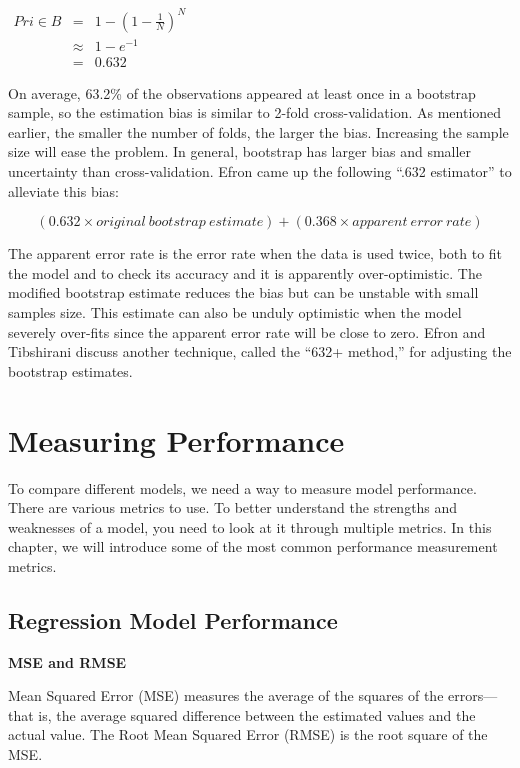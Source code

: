 \documentclass[12pt,]{krantz}
\begin{document}
\(\begin{array}{ccc} Pr{i\in B} & = & 1-\left(1-\frac{1}{N}\right)^{N}\\  & \approx & 1-e^{-1}\\  & = & 0.632 \end{array}\)

On average, 63.2\% of the observations appeared at least once in a bootstrap sample, so the estimation bias is similar to 2-fold cross-validation. As mentioned earlier, the smaller the number of folds, the larger the bias. Increasing the sample size will ease the problem. In general, bootstrap has larger bias and smaller uncertainty than cross-validation. Efron came up the following ``.632 estimator'' to alleviate this bias:

\[(0.632 × original\ bootstrap\ estimate) + (0.368 × apparent\ error\ rate)\]

The apparent error rate is the error rate when the data is used twice, both to fit the model and to check its accuracy and it is apparently over-optimistic. The modified bootstrap estimate reduces the bias but can be unstable with small samples size. This estimate can also be unduly optimistic when the model severely over-fits since the apparent error rate will be close to zero. Efron and Tibshirani \citep{b632plus} discuss another technique, called the ``632+ method,'' for adjusting the bootstrap estimates.

\hypertarget{measuring-performance}{%
\chapter{Measuring Performance}\label{measuring-performance}}

To compare different models, we need a way to measure model performance. There are various metrics to use. To better understand the strengths and weaknesses of a model, you need to look at it through multiple metrics. In this chapter, we will introduce some of the most common performance measurement metrics.

\hypertarget{regression-model-performance}{%
\section{Regression Model Performance}\label{regression-model-performance}}

\textbf{MSE and RMSE}

Mean Squared Error (MSE) measures the average of the squares of the errors---that is, the average squared difference between the estimated values and the actual value. The Root Mean Squared Error (RMSE) is the root square of the MSE.
\end{document}
